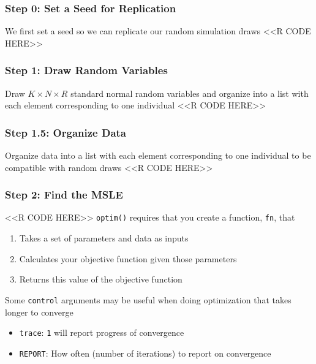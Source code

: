\documentclass{beamer}
\begin{document}
\begin{frame}[fragile]\frametitle{Step 0: Set a Seed for Replication}
	We first set a seed so we can replicate our random simulation draws 
    \vspace{1ex}
    <<R CODE HERE>>
\end{frame}

\begin{frame}[fragile]\frametitle{Step 1: Draw Random Variables}
	Draw $K \times N \times R$ standard normal random variables and organize into a list with each element corresponding to one individual
    \vspace{1ex}
    <<R CODE HERE>>
\end{frame}

\begin{frame}[fragile]\frametitle{Step 1.5: Organize Data}
    Organize data into a list with each element corresponding to one individual to be compatible with random draws
    \vspace{1ex}
    <<R CODE HERE>>
\end{frame}

\begin{frame}[fragile]\frametitle{Step 2: Find the MSLE}
    <<R CODE HERE>>
    \vspace{2ex}
	\texttt{optim()} requires that you create a function, \texttt{fn}, that
	\begin{enumerate}
		\item Takes a set of parameters and data as inputs
		\item Calculates your objective function given those parameters
		\item Returns this value of the objective function
	\end{enumerate}
	\vspace{2ex}
	Some \texttt{control} arguments may be useful when doing optimization that takes longer to converge
	\begin{itemize}
		\item \texttt{trace}: \texttt{1} will report progress of convergence
		\item \texttt{REPORT}: How often (number of iterations) to report on convergence
	\end{itemize}
\end{frame}
\end{document}

